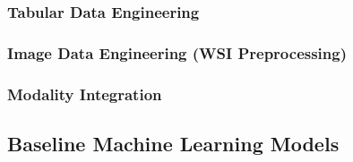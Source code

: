 \documentclass[11pt,a4paper]{article}
\begin{document}
\subsubsection{Tabular Data Engineering}

\subsubsection{Image Data Engineering (WSI Preprocessing)}

\subsubsection{Modality Integration}

\subsection{Baseline Machine Learning Models}
\label{subsec:baseline_ml}
\end{document}
